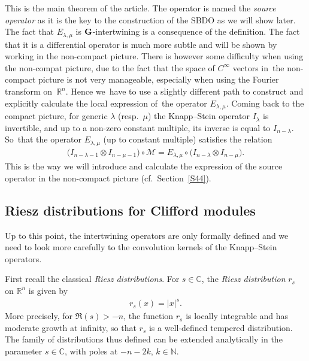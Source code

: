 \documentclass[pdftex]{sigma}
\numberwithin{equation}{section}
\begin{document}
 This is the main theorem of the article. The operator is named the \emph{source operator} as it is the key to the construction of the SBDO as we will show later. The fact that $E_{\lambda,\mu}$ is $\bf G$-intertwining is a consequence of the definition. The fact that it is a differential operator is much more subtle and will be shown by working in the non-compact picture. There is however some difficulty when using the non-compat picture, due to the fact that the space of $C^\infty$ vectors in~the non-compact picture is not very manageable, especially when using the Fourier transform on~$\mathbb R^n$. Hence we~have to use a slightly different path to construct and explicitly calculate the local expression of~the operator $E_{\lambda, \mu}$. Coming back to the compact picture, for generic $\lambda$ (resp.~$\mu$) the Knapp--Stein operator $I_\lambda$ is invertible, and up to a non-zero constant multiple, its inverse is equal to $I_{n-\lambda}$. So~that the operator $E_{\lambda, \mu}$ (up to constant multiple) satisfies the relation
\begin{gather*}
\big(I_{n-\lambda-1} \otimes I_{n-\mu-1}\big) \circ \mathcal{M} = E_{\lambda, \mu} \circ \big(I_{n-\lambda} \otimes I_{ n-\mu}\big) .
\end{gather*}
This is the way we will introduce and calculate the expression of the source operator in the non-compact picture (cf.~Section~\ref{S44}).


\subsection{Riesz distributions for Clifford modules}\label{S42}
Up to this point, the intertwining operators are only formally defined and we need to look more carefully to the convolution kernels of the Knapp--Stein operators.

First recall the classical \emph{Riesz distributions}. For $s\in \mathbb C$, the \emph{Riesz distribution} $r_s$ on $\mathbb R^n$ is given by
\begin{gather*}
r_s(x) = \vert x\vert^s .
\end{gather*}
More precisely, for $\Re(s)>-n$, the function $r_s$ is locally integrable and has moderate growth at infinity, so that $r_s$ is a well-defined tempered distribution. The family of distributions thus defined can be extended analytically in the parameter $s\in \mathbb C$, with poles at $ -n-2k$, $k\in \mathbb N$.
\end{document}
